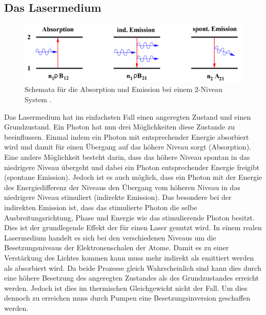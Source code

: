 \subsection{Das Lasermedium}
\begin{figure}
	\centering
	\includegraphics[width=\linewidth-100pt,height=\textheight-100pt,keepaspectratio]{content/Images/emission.png}
	\caption{Schemata für die Absorption und Emission bei einem 2-Niveau System \cite{V61}.}
\end{figure}
Das Lasermedium hat im einfachsten Fall einen angeregten Zustand und einen Grundzustand. Ein Photon hat nun drei Möglichkeiten diese Zustande zu beeinflussen. Einmal indem ein Photon mit entsprechender Energie absorbiert wird und damit für einen Übergang auf das höhere Niveau sorgt (Absorption). Eine andere Möglichkeit besteht darin, dass das höhere Niveau spontan in das niedrigere Niveau übergeht und dabei ein Photon entsprechender Energie freigibt (spontane Emission). Jedoch ist es auch möglich, dass ein Photon mit der Energie des Energiedifferenz der Niveaus den Übergang vom höheren Niveau in das niedrigere Niveau stimuliert (indirekte Emission). 
Das besondere bei der indirekten Emission ist, dass das stimulierte Photon die selbe Ausbreitungsrichtung, Phase und Energie wie das stimulierende Photon besitzt. Dies ist der grundlegende Effekt der für einen Laser genutzt wird. In einem realen Lasermedium handelt es sich bei den verschiedenen Niveaus um die Besetzungsniveaus der Elektronenschalen der Atome. Damit es zu einer Verstärkung des Lichtes kommen kann muss mehr indirekt als emittiert werden als absorbiert wird. Da beide Prozesse gleich Wahrscheinlich sind kann dies durch eine höhere Besetzung des angeregten Zustandes als des Grundzustandes erreicht werden. Jedoch ist dies im thermischen Gleichgewicht nicht der Fall. Um dies dennoch zu erreichen muss durch Pumpen eine Besetzungsinversion geschaffen werden.

